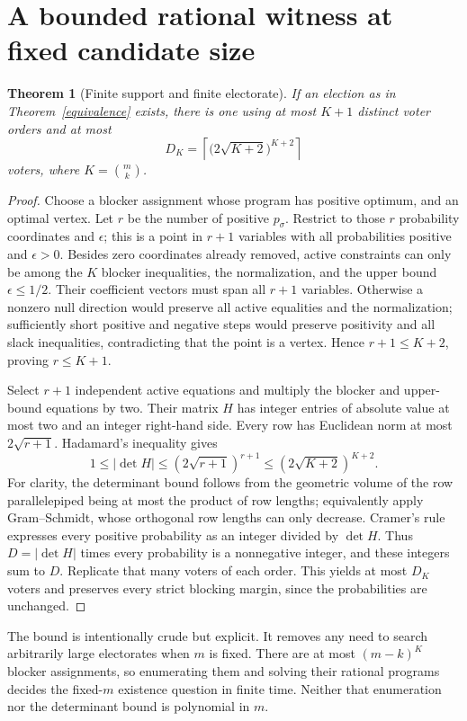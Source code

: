 \documentclass[11pt]{article}
\newtheorem{theorem}{Theorem}
\theoremstyle{definition}
\begin{document}
\section{A bounded rational witness at fixed candidate size}
\begin{theorem}[Finite support and finite electorate]\label{witness}
If an election as in Theorem~\ref{equivalence} exists, there is one using
at most $K+1$ distinct voter orders and at most
\[
 D_K=\left\lceil\bigl(2\sqrt{K+2}\bigr)^{K+2}\right\rceil
\]
voters, where $K=\binom mk$.
\end{theorem}
\begin{proof}
Choose a blocker assignment whose program has positive optimum, and an
optimal vertex. Let $r$ be the number of positive $p_\sigma$. Restrict
to those $r$ probability coordinates and $\epsilon$; this is a point in
$r+1$ variables with all probabilities positive and $\epsilon>0$.
Besides zero coordinates already removed, active constraints can only be
among the $K$ blocker inequalities, the normalization, and the upper
bound $\epsilon\le1/2$. Their coefficient vectors must span all $r+1$
variables. Otherwise a nonzero null direction would preserve all active
equalities and the normalization; sufficiently short positive and negative
steps would preserve positivity and all slack inequalities, contradicting
that the point is a vertex. Hence $r+1\le K+2$, proving $r\le K+1$.

Select $r+1$ independent active equations and multiply the blocker and
upper-bound equations by two. Their matrix $H$ has integer entries of
absolute value at most two and an integer right-hand side. Every row has
Euclidean norm at most $2\sqrt{r+1}$. Hadamard's inequality gives
\[
 1\le|\det H|\le(2\sqrt{r+1})^{r+1}
                  \le(2\sqrt{K+2})^{K+2}.
\]
For clarity, the determinant bound follows from the geometric volume of
the row parallelepiped being at most the product of row lengths; equivalently
apply Gram--Schmidt, whose orthogonal row lengths can only decrease.
Cramer's rule expresses every positive probability as an integer divided
by $\det H$. Thus $D=|\det H|$ times every probability is a nonnegative
integer, and these integers sum to $D$. Replicate that many voters of each
order. This yields at most $D_K$ voters and preserves every strict
blocking margin, since the probabilities are unchanged.
\end{proof}
The bound is intentionally crude but explicit. It removes any need to
search arbitrarily large electorates when $m$ is fixed. There are at most
$(m-k)^K$ blocker assignments, so enumerating them and solving their
rational programs decides the fixed-$m$ existence question in finite time.
Neither that enumeration nor the determinant bound is polynomial in $m$.
\end{document}
